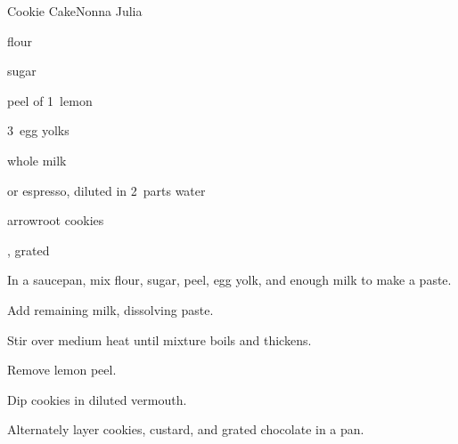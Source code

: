 \begin{recipe}{Cookie Cake}{Nonna Julia}{}

\begin{ingredients}
\item {} flour
\item \C{\half} sugar
\item peel of 1~lemon
\item 3~egg yolks
\item {} whole milk
\item {} or espresso, diluted in 2~parts water
\item arrowroot cookies
\item {}, grated
\end{ingredients}

\begin{directions}
\item In a saucepan, mix flour, sugar, peel, egg yolk, and enough milk to make a paste.
\item Add remaining milk, dissolving paste.
\item Stir over medium heat until mixture boils and thickens.
\item Remove lemon peel.
\item Dip cookies in diluted vermouth.
\item Alternately layer cookies, custard, and grated chocolate in a pan.
\end{directions}

\end{recipe}
